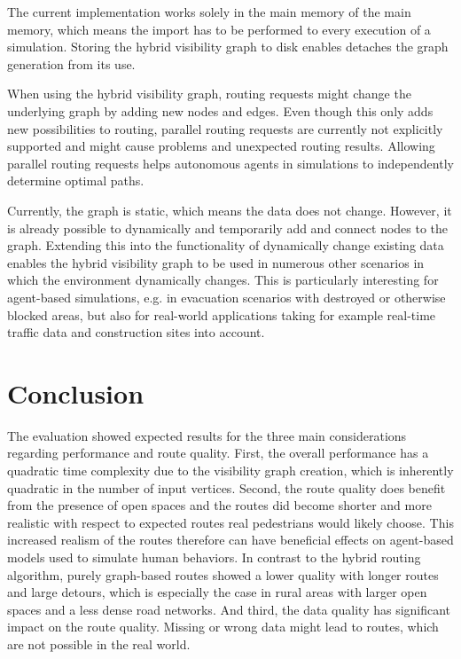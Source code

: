 		The current implementation works solely in the main memory of the main memory, which means the import has to be performed to every execution of a simulation.
		Storing the hybrid visibility graph to disk enables detaches the graph generation from its use.
		
		When using the hybrid visibility graph, routing requests might change the underlying graph by adding new nodes and edges.
		Even though this only adds new possibilities to routing, parallel routing requests are currently not explicitly supported and might cause problems and unexpected routing results.
		Allowing parallel routing requests helps autonomous agents in simulations to independently determine optimal paths.
		
		Currently, the graph is static, which means the data does not change.
		However, it is already possible to dynamically and temporarily add and connect nodes to the graph.
		Extending this into the functionality of dynamically change existing data enables the hybrid visibility graph to be used in numerous other scenarios in which the environment dynamically changes.
		This is particularly interesting for agent-based simulations, e.g. in evacuation scenarios with destroyed or otherwise blocked areas, but also for real-world applications taking for example real-time traffic data and construction sites into account.
		
\section{Conclusion}

	The evaluation showed expected results for the three main considerations regarding performance and route quality.
	First, the overall performance has a quadratic time complexity due to the visibility graph creation, which is inherently quadratic in the number of input vertices.
	Second, the route quality does benefit from the presence of open spaces and the routes did become shorter and more realistic with respect to expected routes real pedestrians would likely choose.
	This increased realism of the routes therefore can have beneficial effects on agent-based models used to simulate human behaviors.
	In contrast to the hybrid routing algorithm, purely graph-based routes showed a lower quality with longer routes and large detours, which is especially the case in rural areas with larger open spaces and a less dense road networks.
	And third, the data quality has significant impact on the route quality.
	Missing or wrong data might lead to routes, which are not possible in the real world.
	
